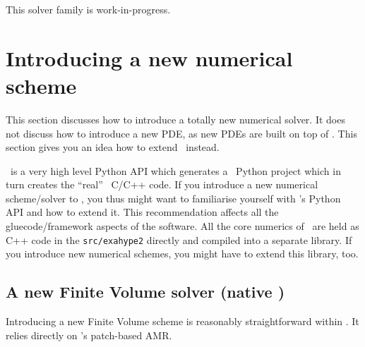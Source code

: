 \begin{remark}
 This solver family is work-in-progress.
\end{remark}



 


\section{Introducing a new numerical scheme}

This section discusses how to introduce a totally new numerical solver. 
It does not discuss how to introduce a new PDE, as new PDEs are built on top of
\ExaHyPE.
This section gives you an idea how to extend \ExaHyPE\ instead.

\begin{remark}
  \ExaHyPE\ is a very high level Python API which generates a \Peano\
   Python project which in turn creates the ``real'' \Peano\ C/C++ code. If you
   introduce a new numerical scheme/solver to \ExaHyPE, you thus might want to
   familiarise yourself with \Peano's Python API and how to extend it. This
   recommendation affects all the gluecode/framework aspects of the software.
   All the core numerics of \ExaHyPE\ are held as C++ code in the
   \texttt{src/exahype2} directly and compiled into a separate library. If you
   introduce new numerical schemes, you might have to extend this library, too.
\end{remark}



\subsection{A new Finite Volume solver (native \ExaHyPE)}

Introducing a new Finite Volume scheme is reasonably straightforward within
\ExaHyPE.
It relies directly on \Peano's patch-based AMR.


